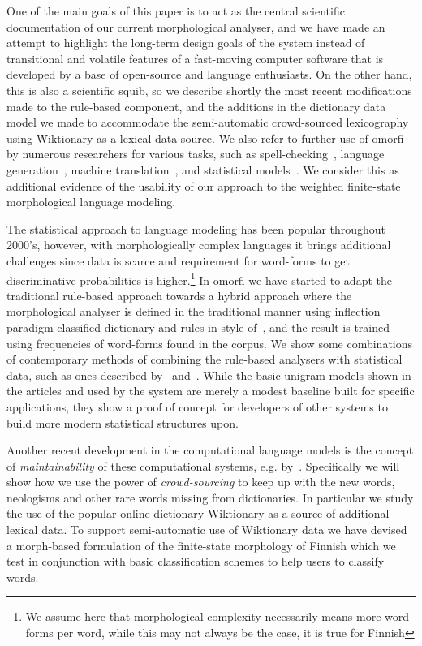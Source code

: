 \documentclass[a4paper,12pt]{article}
\begin{document}
One of the main goals of this paper is to act as the
central scientific documentation of our current
morphological analyser, and we have made an attempt
to highlight the long-term design goals of the system
instead of transitional and volatile features of a
fast-moving computer software that is developed by a
base of open-source and language enthusiasts. On the
other hand, this is also a scientific squib, so we
describe shortly the most recent modifications made
to the rule-based component, and the additions in the
dictionary data model we made to accommodate the
semi-automatic crowd-sourced lexicography using
Wiktionary as a lexical data source.  We also refer
to further use of omorfi by numerous researchers for
various tasks, such as
spell-checking~\citep{pirinen2014weighted}, language
generation~\citep{toivanen2012corpus}, machine
translation~\cite{clifton2011combining}, and
statistical
models~\citep{haverinen2013building,bohnet2013joint}.
We consider this as additional evidence of the
usability of our approach to the weighted finite-state
morphological language modeling.

The statistical approach to language modeling has
been popular throughout 2000's, however, with
morphologically complex languages it brings
additional challenges since data is scarce and
requirement for word-forms to get discriminative
probabilities is higher.\footnote{We assume here that
    morphological complexity necessarily means more
    word-forms per word, while this may not always be
the case, it is true for Finnish} In omorfi we have
started to adapt the traditional rule-based approach
towards a hybrid approach where the morphological
analyser is defined in the traditional manner using
inflection paradigm classified dictionary and rules
in style of~\citet{koskenniemi1983twolevel}, and the
result is trained using frequencies of word-forms
found in the corpus. We show some combinations of
contemporary methods of combining the rule-based
analysers with statistical data, such as ones
described by~\citet{pirinen2009weighted}
and~\citet{pirinen2012improving}.  While the basic
unigram models shown in the articles and used by the
system are merely a modest baseline built for
specific applications, they show a proof of concept
for developers of other systems to build more modern
statistical structures upon.


Another recent development in the computational language models is the concept
of \emph{maintainability} of these computational systems, e.g.
by~\cite{maxwell2008joint,pirinen2011modularisation}. Specifically we will show
how we use the power of \emph{crowd-sourcing} to keep up with the new words,
neologisms and other rare words missing from dictionaries. In particular we
study the use of the popular online dictionary Wiktionary as a source of
additional lexical data. To support semi-automatic use of Wiktionary data we
have devised a morph-based formulation of the finite-state morphology of
Finnish which we test in conjunction with basic classification schemes to help
users to classify words.
\end{document}
